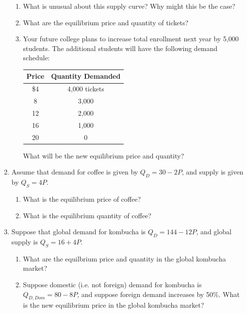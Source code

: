 \documentclass{article}
\begin{document}
\begin{enumerate}
	\begin{enumerate}
	
	\item What is unusual about this supply curve? Why might this be the case?
	
	\item What are the equilibrium price and quantity of tickets?
	
	\item Your future college plans to increase total enrollment next year by 5,000 students. The additional students will have the following demand schedule:
	
	\begin{center}
	\begin{tabular}{c c}
	\textbf{Price} & \textbf{Quantity Demanded} \\
	\hline
	\$4 & 4,000 tickets \\
	8 & 3,000 \\
	12 & 2,000 \\
	16 & 1,000 \\
	20 & 0 \\
	\end{tabular}
	\end{center}
	
	What will be the new equilibrium price and quantity? 
	
	\end{enumerate}
	
\item Assume that demand for coffee is given by $Q_D = 30 - 2P$, and supply is given by $Q_S = 4P$.

	\begin{enumerate}
	
	\item What is the equilibrium price of coffee?
	
	\item What is the equilibrium quantity of coffee?
	
	\end{enumerate}
	
\item Suppose that global demand for kombucha is $Q_D = 144 - 12P$, and global supply is $Q_S = 16 + 4P$.

	\begin{enumerate}
	
	\item What are the equilbrium price and quantity in the global kombucha market?
	
	\item Suppose domestic (i.e. not foreign) demand for kombucha is \\ $Q_{D,Dom} = 80 - 8P$, and suppose foreign demand increases by 50\%. What is the new equilibrium price in the global kombucha market?
	
	\end{enumerate}

\end{enumerate}
\end{document}
